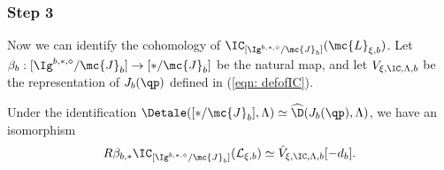 \documentclass[letterpaper,11pt]{amsart}
\begin{document}
\subsubsection{Step 3}
Now we can identify the cohomology of $\IC_{[\Ig^{b,\ast,\diamond}/\mc{J}_b]}(\mc{L}_{\xi,b})$. Let $\beta_b: [\Ig^{b,\ast,\diamond}/\mc{J}_b]\to [\ast/\mc{J}_b]$ be the natural map, and let $V_{\xi,\IC,\Lambda,b}$ be the representation of $J_b(\qp)$ defined in (\ref{eqn: defofIC}).
\begin{proposition}\label{prop: CohoSmallDiamond}
    Under the identification $\Detale([\ast/\mc{J}_b],\Lambda)\simeq \widehat{\D}(J_b(\qp),\Lambda)$, we have an isomorphism
    \[R\beta_{b,\ast}\IC_{[\Ig^{b,\ast,\diamond}/\mc{J}_b]}(\mathcal{L}_{\xi, b}) \simeq \hat{V}_{\xi,\IC,\Lambda,b}[-d_b].\]
\end{proposition}
\end{document}
